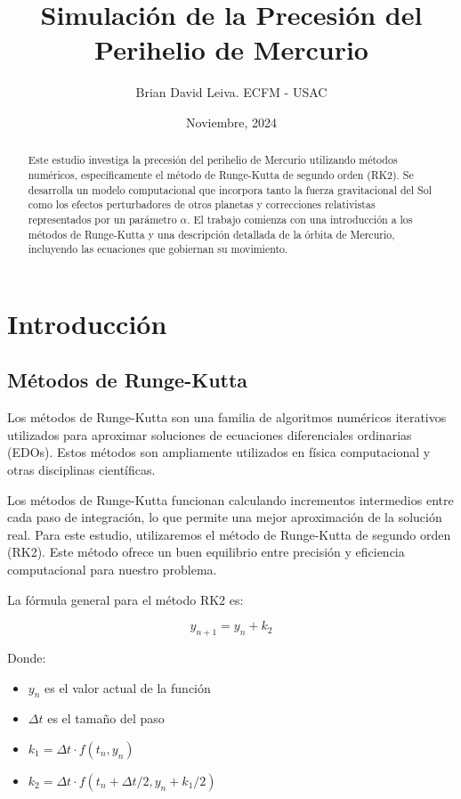 \documentclass[twocolumn]{article}
\title{Simulación de la Precesión del Perihelio de Mercurio}
\author{Brian David Leiva. ECFM - USAC}
\date{Noviembre, 2024}
\begin{document}
\maketitle

\begin{abstract}
Este estudio investiga la precesión del perihelio de Mercurio utilizando métodos numéricos, específicamente el método de Runge-Kutta de segundo orden (RK2). Se desarrolla un modelo computacional que incorpora tanto la fuerza gravitacional del Sol como los efectos perturbadores de otros planetas y correcciones relativistas representados por un parámetro $\alpha$. El trabajo comienza con una introducción a los métodos de Runge-Kutta y una descripción detallada de la órbita de Mercurio, incluyendo las ecuaciones que gobiernan su movimiento.
\end{abstract}
\section{Introducción}

\subsection*{Métodos de Runge-Kutta}

Los métodos de Runge-Kutta son una familia de algoritmos numéricos iterativos utilizados para aproximar soluciones de ecuaciones diferenciales ordinarias (EDOs). Estos métodos son ampliamente utilizados en física computacional y otras disciplinas científicas.

Los métodos de Runge-Kutta funcionan calculando incrementos intermedios entre cada paso de integración, lo que permite una mejor aproximación de la solución real. Para este estudio, utilizaremos el método de Runge-Kutta de segundo orden (RK2). Este método ofrece un buen equilibrio entre precisión y eficiencia computacional para nuestro problema.

La fórmula general para el método RK2 es:

\begin{equation}
y_{n+1} = y_n + k_2
\end{equation}

Donde:
\begin{itemize}
\item $y_n$ es el valor actual de la función
\item $\Delta t$ es el tamaño del paso
\item $k_1 = \Delta t \cdot f(t_n, y_n)$
\item $k_2 = \Delta t \cdot f(t_n + \Delta t/2, y_n + k_1/2)$
\end{itemize}
\end{document}
